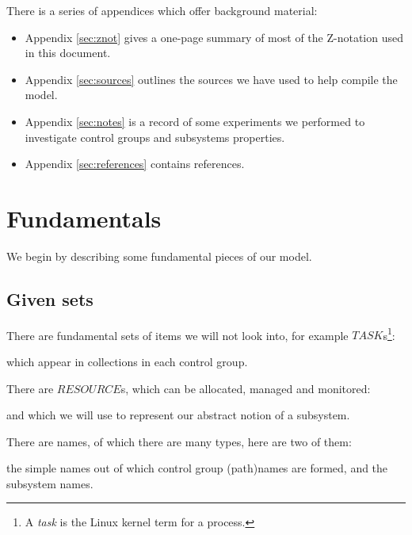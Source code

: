 \documentclass[a4paper,twoside,12pt]{article}
\begin{document}
There is a series of appendices which offer background material:
\begin{itemize}
\item Appendix \ref{sec:znot} gives a one-page summary of most of the Z-notation used in this document.

\item Appendix \ref{sec:sources} outlines the sources we have used to help compile the model.

\item Appendix \ref{sec:notes} is a record of some experiments we performed to investigate control groups and subsystems properties.

\item Appendix \ref{sec:references} contains references.

\end{itemize}

\section{Fundamentals}
\label{sec:fundamentals}

We begin by describing some fundamental pieces of our model.

\subsection{Given sets}
There are fundamental sets of items we will not look into, 
for example $TASK$s\footnote{A \emph{task} is the Linux kernel term for a process.}:
\begin{zed}
[TASK]
\end{zed}
which appear in collections in each control group.

There are $RESOURCE$s, which can be allocated, managed and monitored:
\begin{zed}
[RESOURCE]
\end{zed}
and which we will use to represent our abstract notion of a subsystem.

There are names, of which there are many types, here are two of them:
\begin{zed}
\end{zed}
the simple names out of which control group (path)names are formed, and the subsystem names.
\end{document}
